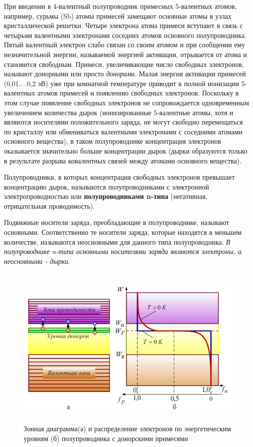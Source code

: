     \par При введении в 4-валентный полупроводник примесных 5-валентных атомов, например, сурьмы (Sb) атомы примесей замещают основные атомы в узлах кристаллической решетки. Четыре электрона атома примеси вступают в связь с четырьмя валентными электронами соседних атомов основного полупроводника. Пятый валентный электрон слабо связан со своим атомом и при сообщении ему незначительной энергии, называемой энергией активации, отрывается от атома и становится свободным. Примеси, увеличивающие число свободных электронов, называют донорными или просто \textit{донорами}. Малая энергия активации примесей (0,01.. .0,2 эВ) уже при комнатной температуре приводит к полной ионизации 5-валентных атомов примесей и появлению свободных электронов. Поскольку в этом случае появление свободных электронов не сопровождается одновременным увеличением количества дырок (ионизированные 5-валентные атомы, хотя и являются носителями положительного заряда, не могут свободно перемещаться по кристаллу или обмениваться валентными электронами с соседними атомами основного вещества), в таком полупроводнике концентрация электронов оказывается значительно больше концентрации дырок (дырки образуются только в результате разрыва ковалентных связей между атомами основного вещества). 
    
    \par Полупроводники, в которых концентрация свободных электронов превышает концентрацию дырок, называются полупроводниками с электронной электропроводностью или \textbf{полупроводниками n-типа} (негативная, отрицательная проводимость).
	
	\par Подвижные носители заряда, преобладающие в полупроводнике, называют основными. Соответственно те носители заряда, которые находятся в меньшем количестве, называются неосновными для данного типа полупроводника. \textit{В полупроводнике n-типа основными носителями заряда являются электроны, а неосновными - дырки}.
	
	\begin{figure}[h]
		\centering
		\includegraphics[height=8cm]{img/9} 
		\captionsetup{font=footnotesize}
		\caption{Зонная диаграмма(а) и распределение электронов по энергетическим уровням (б) полупроводника с донорскими примесями} 
	\end{figure}
	

